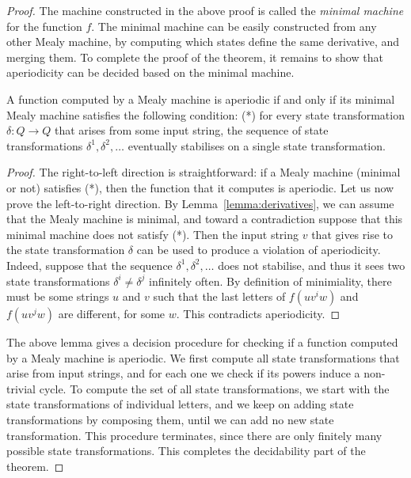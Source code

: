 \begin{proof}
    The machine constructed in the above proof is called the \emph{minimal machine} for the function $f$. The minimal machine can be easily constructed from any other Mealy machine, by computing which states define the same derivative, and merging them. To complete the proof of the theorem, it remains to show that aperiodicity can be decided based on the minimal machine.

    \begin{lemma}\label{lem:aperiodicity-minimal-machine}
        A function computed by a  Mealy machine is aperiodic if and only if its minimal Mealy machine satisfies the following condition: (*) for every state transformation $\delta : Q \to Q$ that arises from some input string, the    sequence of state transformations $\delta^1, \delta^2,\ldots$  eventually stabilises on a single state transformation.
    \end{lemma}
    \begin{proof} The right-to-left direction is straightforward: if a Mealy machine (minimal or not) satisfies (*), then the function that it computes is aperiodic. 
        Let us now prove the left-to-right direction. By Lemma~\ref{lemma:derivatives}, we can assume that the Mealy machine is minimal, and toward a contradiction suppose that this minimal machine does not satisfy (*). Then the input string $v$  that gives rise to the state transformation $\delta$ can be used to produce a violation of aperiodicity. Indeed, suppose that the sequence $\delta^1, \delta^2,\ldots$ does not stabilise, and thus it sees two state transformations $\delta^i \neq  \delta^j$ infinitely often. By definition of minimiality, there must be some strings $u$ and $v$ such that the last letters of $f(uv^iw)$ and $f(uv^jw)$ are different, for some $w$. This contradicts aperiodicity.
    \end{proof}

    The above lemma gives a decision procedure for checking if a function computed by a Mealy machine is aperiodic. We first compute all state transformations that arise from input strings, and for each one we check if its powers induce a non-trivial cycle. To compute the set of all state transformations, we start with the state transformations of individual letters, and we keep on adding state transformations by composing them, until we can add no new state transformation. This procedure terminates, since there are only finitely many possible state transformations.   This completes the decidability part of the theorem.


\end{proof}
